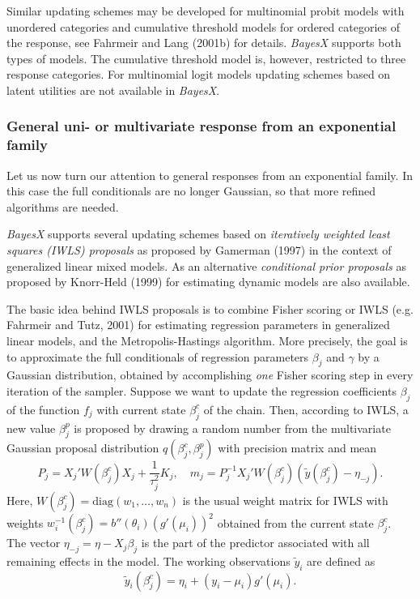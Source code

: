 \documentclass[11pt,a4paper,twoside]{bayesxarticle}
\newcommand{\diag}{\mbox{diag}}
\begin{document}
Similar updating schemes may be developed for multinomial probit
models with unordered categories and cumulative threshold models for
ordered categories of the response, see Fahrmeir and Lang (2001b)
for details. {\em BayesX} supports both types of models. The
cumulative threshold model is, however, restricted to three response
categories. For multinomial logit models updating schemes based on
latent utilities are not available in {\em BayesX}.

\subsubsection{General uni- or multivariate response from an exponential family}
\label{IWLS} 

Let us now turn our attention to general responses from an
exponential family. In this case the full conditionals are no longer
Gaussian, so that more refined algorithms are needed.

{\em BayesX} supports several updating schemes based on {\em
iteratively weighted least squares (IWLS) proposals} as proposed by
Gamerman (1997) in the context of generalized linear mixed models.
As an alternative {\em conditional prior proposals} as proposed by
Knorr-Held (1999) for estimating dynamic models are also available.

The basic idea behind IWLS proposals is to combine Fisher scoring
or IWLS (e.g. Fahrmeir and Tutz, 2001) for estimating regression
parameters in generalized linear models, and the
Metropolis-Hastings algorithm. More precisely, the goal is to
approximate the full conditionals of regression parameters
$\beta_j$ and $\gamma$ by a Gaussian distribution, obtained by
accomplishing {\em one} Fisher scoring step in every iteration of
the sampler. Suppose we want to update the regression coefficients
$\beta_j$ of the  function $f_j$ with current state $\beta_j^c$ of
the chain. Then, according to IWLS, a new value $\beta_j^p$ is
proposed by drawing a random number from the multivariate Gaussian
proposal distribution $q(\beta_j^c,\beta_j^p)$ with precision
matrix and mean
\begin{equation}
\label{prec} P_j = X_j'W(\beta^c_j)X_j + \frac{1}{\tau^2_j}K_j,
\quad m_j = P_j^{-1}X_j'W(\beta^c_j)(\tilde{y}(\beta^c_j) -
\eta_{-j}).
\end{equation}
Here, $W(\beta^c_j) = \diag(w_1,\dots,w_n)$ is the usual weight
matrix for IWLS with weights $w^{-1}_i(\beta^c_j) =
b''(\theta_i)(g'(\mu_i))^2$ obtained from the current state
$\beta^c_j$. The vector $\eta_{-j}=\eta-X_j\beta_j$ is the part of
the predictor associated with all remaining effects in the model.
The working observations $\tilde{y}_i$ are defined as
$$\tilde{y}_i(\beta^c_j) = \eta_i + (y_i - \mu_i)g'(\mu_i).$$
\end{document}

